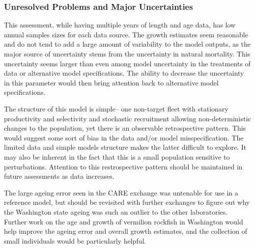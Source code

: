 \documentclass[11pt,
  english,
  a4paper,
]{article}
\begin{document}
\leavevmode\tagmcend\tagstructend\par


\hypertarget{unresolved-problems-and-major-uncertainties-1}{%
\subsubsection{Unresolved Problems and Major Uncertainties}\label{unresolved-problems-and-major-uncertainties-1}}

\leavevmode\tagmcend\tagstructend


This assessment, while having multiple years of length and age data, has low annual samples sizes for each data source. The growth estimates seem reasonable and do not tend to add a large amount of variability to the model outputs, as the major source of uncertainty stems from the uncertainty in natural mortality. This uncertainty seems larger than even among model uncertainty in the treatments of data or alternative model specifications. The ability to decrease the uncertainty in this parameter would then bring attention back to alternative model specifications.

\leavevmode\tagmcend\tagstructend\par


The structure of this model is simple-- one non-target fleet with stationary productivity and selectivity and stochastic recruitment allowing non-deterministic changes to the population, yet there is an observable retrospective pattern. This would suggest some sort of bias in the data and/or model misspecification. The limited data and simple models structure makes the latter difficult to explore. It may also be inherent in the fact that this is a small population sensitive to perturbations. Attention to this restrospective pattern should be maintained in future assessments as data increases.

\leavevmode\tagmcend\tagstructend\par


The large ageing error seen in the CARE exchange was untenable for use in a reference model, but should be revisited with further exchanges to figure out why the Washington state ageing was such an outlier to the other laboratories. Further work on the age and growth of vermilion rockfish in Washington would help improve the ageing error and overall growth estimates, and the collection of small individuals would be particularly helpful.
\end{document}
